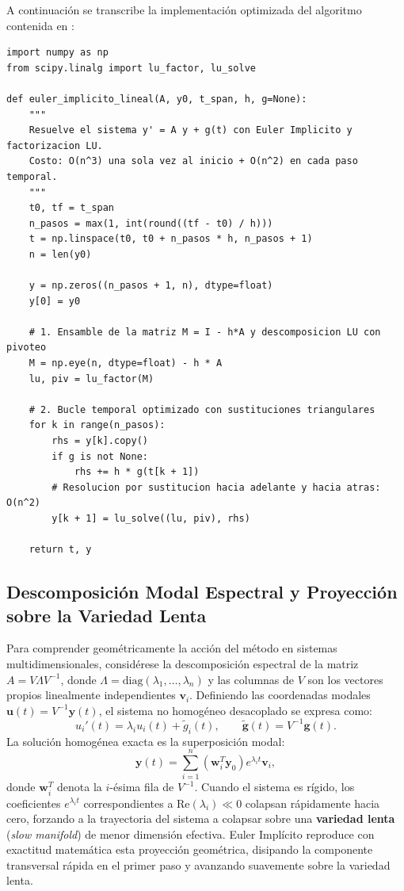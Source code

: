 \documentclass[11pt,a4paper]{article}
\begin{document}
A continuación se transcribe la implementación optimizada del algoritmo contenida en :

\begin{lstlisting}[caption={Implementación optimizada de Euler Implícito con precomputación LU en Python.}]
import numpy as np
from scipy.linalg import lu_factor, lu_solve

def euler_implicito_lineal(A, y0, t_span, h, g=None):
    """
    Resuelve el sistema y' = A y + g(t) con Euler Implicito y factorizacion LU.
    Costo: O(n^3) una sola vez al inicio + O(n^2) en cada paso temporal.
    """
    t0, tf = t_span
    n_pasos = max(1, int(round((tf - t0) / h)))
    t = np.linspace(t0, t0 + n_pasos * h, n_pasos + 1)
    n = len(y0)
    
    y = np.zeros((n_pasos + 1, n), dtype=float)
    y[0] = y0
    
    # 1. Ensamble de la matriz M = I - h*A y descomposicion LU con pivoteo
    M = np.eye(n, dtype=float) - h * A
    lu, piv = lu_factor(M)
    
    # 2. Bucle temporal optimizado con sustituciones triangulares
    for k in range(n_pasos):
        rhs = y[k].copy()
        if g is not None:
            rhs += h * g(t[k + 1])
        # Resolucion por sustitucion hacia adelante y hacia atras: O(n^2)
        y[k + 1] = lu_solve((lu, piv), rhs)
        
    return t, y
\end{lstlisting}

\subsection{Descomposición Modal Espectral y Proyección sobre la Variedad Lenta}
Para comprender geométricamente la acción del método en sistemas multidimensionales, considérese la descomposición espectral de la matriz $A = V \Lambda V^{-1}$, donde $\Lambda = \text{diag}(\lambda_1, \dots, \lambda_n)$ y las columnas de $V$ son los vectores propios linealmente independientes $\mathbf{v}_i$. Definiendo las coordenadas modales $\mathbf{u}(t) = V^{-1}\mathbf{y}(t)$, el sistema no homogéneo desacoplado se expresa como:
\begin{equation}
    u_i'(t) = \lambda_i u_i(t) + \tilde{g}_i(t), \qquad \tilde{\mathbf{g}}(t) = V^{-1}\mathbf{g}(t).
\end{equation}
La solución homogénea exacta es la superposición modal:
\begin{equation}
    \mathbf{y}(t) = \sum_{i=1}^n \left( \mathbf{w}_i^T \mathbf{y}_0 \right) e^{\lambda_i t} \mathbf{v}_i,
\end{equation}
donde $\mathbf{w}_i^T$ denota la $i$-ésima fila de $V^{-1}$. Cuando el sistema es rígido, los coeficientes $e^{\lambda_i t}$ correspondientes a $\text{Re}(\lambda_i) \ll 0$ colapsan rápidamente hacia cero, forzando a la trayectoria del sistema a colapsar sobre una \textbf{variedad lenta} (\textit{slow manifold}) de menor dimensión efectiva. Euler Implícito reproduce con exactitud matemática esta proyección geométrica, disipando la componente transversal rápida en el primer paso y avanzando suavemente sobre la variedad lenta.
\end{document}
